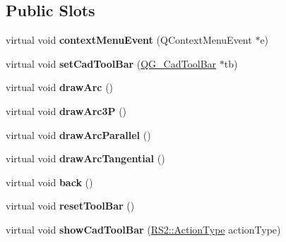 \subsection*{Public Slots}
\begin{DoxyCompactItemize}
\item 
\hypertarget{classQG__CadToolBarArcs_aee53482e1d2486801bd6265c2dcd4df9}{virtual void {\bfseries context\-Menu\-Event} (Q\-Context\-Menu\-Event $\ast$e)}\label{classQG__CadToolBarArcs_aee53482e1d2486801bd6265c2dcd4df9}

\item 
\hypertarget{classQG__CadToolBarArcs_a50c6e6eb2a9c24ad054f177b0cccbe00}{virtual void {\bfseries set\-Cad\-Tool\-Bar} (\hyperlink{classQG__CadToolBar}{Q\-G\-\_\-\-Cad\-Tool\-Bar} $\ast$tb)}\label{classQG__CadToolBarArcs_a50c6e6eb2a9c24ad054f177b0cccbe00}

\item 
\hypertarget{classQG__CadToolBarArcs_ab6ebd43c5b16b59256506a67438c5541}{virtual void {\bfseries draw\-Arc} ()}\label{classQG__CadToolBarArcs_ab6ebd43c5b16b59256506a67438c5541}

\item 
\hypertarget{classQG__CadToolBarArcs_abc117d4fb82d8cad6d539ce2c099d188}{virtual void {\bfseries draw\-Arc3\-P} ()}\label{classQG__CadToolBarArcs_abc117d4fb82d8cad6d539ce2c099d188}

\item 
\hypertarget{classQG__CadToolBarArcs_a46b9ec0909a3bed6decfed3818ecf0c9}{virtual void {\bfseries draw\-Arc\-Parallel} ()}\label{classQG__CadToolBarArcs_a46b9ec0909a3bed6decfed3818ecf0c9}

\item 
\hypertarget{classQG__CadToolBarArcs_af3fb0b973a0dc20f3b18f5d08e5470fb}{virtual void {\bfseries draw\-Arc\-Tangential} ()}\label{classQG__CadToolBarArcs_af3fb0b973a0dc20f3b18f5d08e5470fb}

\item 
\hypertarget{classQG__CadToolBarArcs_afbef712cce674dce26368232e0ef8065}{virtual void {\bfseries back} ()}\label{classQG__CadToolBarArcs_afbef712cce674dce26368232e0ef8065}

\item 
\hypertarget{classQG__CadToolBarArcs_a132bad404fac1355bea159719502e65b}{virtual void {\bfseries reset\-Tool\-Bar} ()}\label{classQG__CadToolBarArcs_a132bad404fac1355bea159719502e65b}

\item 
\hypertarget{classQG__CadToolBarArcs_af9fd41b627dce8f29d174f099a850e4b}{virtual void {\bfseries show\-Cad\-Tool\-Bar} (\hyperlink{classRS2_afe3523e0bc41fd637b892321cfc4b9d7}{R\-S2\-::\-Action\-Type} action\-Type)}\label{classQG__CadToolBarArcs_af9fd41b627dce8f29d174f099a850e4b}

\end{DoxyCompactItemize}
